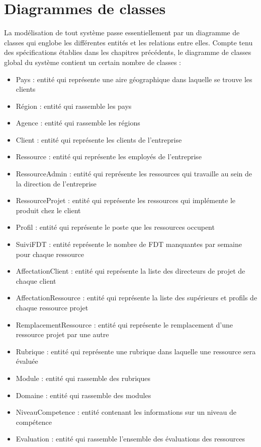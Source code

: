 \section{Diagrammes de classes}
La modélisation de tout système passe essentiellement par un diagramme de classes qui
englobe les différentes entités et les relations entre elles. Compte tenu des spécifications établies dans
les chapitres précédents, le diagramme de classes global du système contient un certain nombre de
classes : 
\begin{itemize}[label=\textbullet]
\item Pays : entité qui représente une aire géographique dans laquelle se trouve les clients 
\item Région : entité qui rassemble les pays
\item Agence : entité qui rassemble les régions
\item Client : entité qui représente les clients de l'entreprise
\item Ressource : entité qui représente les employés de l'entreprise 
\item RessourceAdmin : entité qui représente les ressources qui travaille au sein de la direction de l'entreprise
\item RessourceProjet : entité qui représente les ressources qui implémente le produit chez le client 
\item Profil : entité qui représente le poste que les ressources occupent
\item SuiviFDT : entité représente le nombre de FDT manquantes par semaine pour chaque ressource
\item AffectationClient : entité qui représente la liste des directeurs de projet de chaque client
\item AffectationRessource : entité qui représente la liste des supérieurs et profils de chaque ressource projet 
\item RemplacementRessource :  entité qui représente le remplacement d'une ressource projet par une autre
\item Rubrique : entité qui représente une rubrique dans laquelle une ressource sera évaluée
\item Module : entité qui rassemble des rubriques
\item Domaine : entité qui rassemble des modules
\item NiveauCompetence : entité contenant les informations sur un niveau de compétence
\item Evaluation : entité qui rassemble l'ensemble des évaluations des ressources
\end{itemize}
